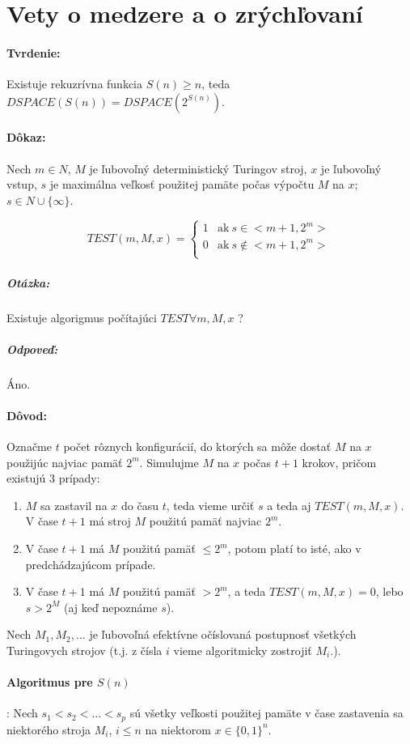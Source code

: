 \documentclass{article}
\begin{document}
\section{Vety o medzere a o zrýchľovaní}
\paragraph{Tvrdenie:} Existuje rekuzrívna funkcia $S(n) \geq n$, teda
$DSPACE(S(n))=DSPACE(2^{S(n)})$.
\paragraph{Dôkaz:}Nech $m \in N$, $M$ je ľubovoľný deterministický Turingov
stroj, $x$ je ľubovoľný vstup, $s$ je maximálna veľkosť použitej pamäte počas
výpočtu $M$ na $x$; $s \in N \cup \{\infty\}$.

$$
TEST(m,M,x) = \left\{ \begin{array}{ll}
1 & \mbox{ak}~s \in <m+1,2^m> \\
0 & \mbox{ak}~s \notin <m+1,2^m> \\
\end{array}
\right.
$$

\subparagraph{Otázka:} Existuje algorigmus počítajúci $TEST \forall m,M,x$ ?
\subparagraph{Odpoveď:} Áno.
\paragraph{Dôvod:} Označme $t$ počet rôznych konfigurácií, do ktorých sa môže
dostať $M$ na $x$ použijúc najviac pamäť $2^m$. Simulujme $M$ na $x$ počas $t+1$
krokov, pričom existujú 3 prípady:
\begin{enumerate}
	\item $M$ sa zastavil na $x$ do času $t$, teda vieme určiť $s$ a teda aj
	$TEST(m,M,x)$. V čase $t+1$ má stroj $M$ použitú pamäť najviac $2^m$.
	\item V čase $t+1$ má $M$ použitú pamäť $\leq 2^m$, potom platí to isté,
	ako v predchádzajúcom prípade.
	\item V čase $t+1$ má $M$ použitú pamäť $> 2^m$, a teda $TEST(m,M,x)=0$,
	lebo $s>2^M$ (aj keď nepoznáme $s$).
\end{enumerate}
Nech $M_1, M_2, ...$ je ľubovoľná efektívne očíslovaná postupnosť všetkých
Turingovych strojov (t.j. z čísla $i$ vieme algoritmicky zostrojiť $M_i$.).
\paragraph{Algoritmus pre $S(n)$}: Nech $s_1 < s_2 < ... < s_p$ sú všetky
veľkosti použitej pamäte v čase zastavenia sa niektorého stroja $M_i$, $i \leq
n$ na niektorom $x \in \{0, 1\}^n$.
\end{document}
